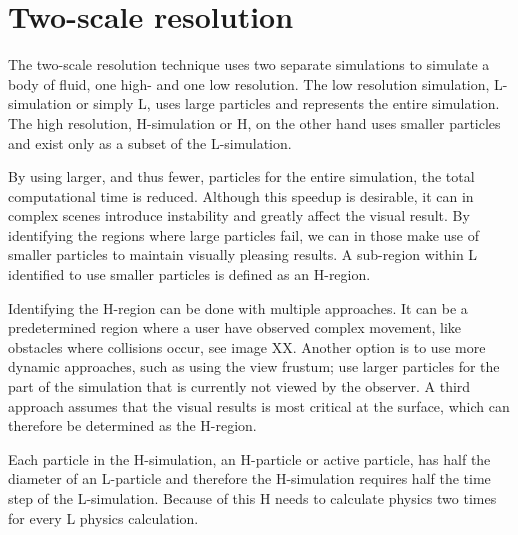 \documentclass[../../main.tex]{subfiles}
\begin{document}
    
  
   
    
    
    
    
\section{Two-scale resolution}
The two-scale resolution technique uses two separate simulations to simulate a body of fluid, one high- and one low resolution. The low resolution simulation, L-simulation or simply L, uses large particles and represents the entire simulation. The high resolution, H-simulation or H, on the other hand uses smaller particles and exist only as a subset of the L-simulation. 

By using larger, and thus fewer, particles for the entire simulation, the total computational time is reduced. Although this speedup is desirable, it can in complex scenes introduce instability and greatly affect the visual result. By identifying the regions where large particles fail, we can in those make use of smaller particles to maintain visually pleasing results. A sub-region within L identified to use smaller particles is defined as an H-region.

Identifying the H-region can be done with multiple approaches. It can be a predetermined region where a user have observed complex movement, like obstacles where collisions occur, see image XX. Another option is to use more dynamic approaches, such as using the view frustum; use larger particles for the part of the simulation that is currently not viewed by the observer. A third approach assumes that the visual results is most critical at the surface, which can therefore be determined as the H-region.

Each particle in the H-simulation, an H-particle or active particle, has half the diameter of an L-particle and therefore the H-simulation requires half the time step of the L-simulation. Because of this H needs to calculate physics two times for every L physics calculation. 
\end{document}
